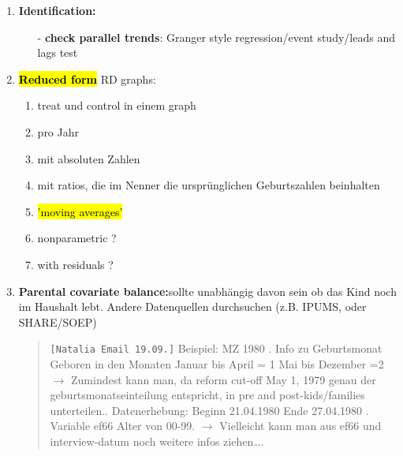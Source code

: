 \documentclass[11pt,a4paper]{article}
\begin{document}
{\begin{enumerate}
\begin{itemize}
\end{itemize}


\item \textbf{Identification:}\vspace{-1em}
\begin{itemize}
\item[-]\textbf{check parallel trends}: Granger style regression/event study/leads and lags test
\end{itemize}


\item \textbf{\hl{Reduced form}}\newline 
RD graphs:\vspace{-1em}
\begin{enumerate}
\item treat und control in einem graph
\item pro Jahr
\item mit absoluten Zahlen
\item mit ratios, die im Nenner die ursprünglichen Geburtszahlen beinhalten
\item \hl{'moving averages'}
\item nonparametric ? 
\item with residuals ? 
\end{enumerate}
\item \textbf{Parental covariate balance:}\newline sollte unabhängig davon sein ob das Kind noch im Haushalt lebt. Andere Datenquellen durchsuchen (z.B. IPUMS, oder SHARE/SOEP)
\begin{quote}
\texttt{[Natalia Email 19.09.]}\newline
Beispiel: MZ 1980 .	Info zu Geburtsmonat   Geboren in den Monaten
Januar bis April = 1
Mai bis Dezember  =2 \newline
$\rightarrow$	Zumindest kann man, da reform cut-off May 1, 1979 genau der geburtsmonatseinteilung entspricht, in pre and post-kids/families unterteilen..	Datenerhebung: 
Beginn 21.04.1980 
Ende 27.04.1980 . Variable ef66 Alter von 00-99.\newline
$\rightarrow$	Vielleicht kann man aus ef66 und interview-datum noch weitere infos ziehen….
\end{quote}



\end{enumerate}}
\end{document}
